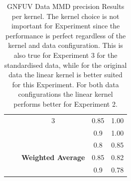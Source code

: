 \documentclass{mpaper}
\begin{document}
\begin{table}[]
\begin{tabular}{|l|c|ccc|}
                                            &                 & \multicolumn{1}{c|}{3}                         & \multicolumn{1}{c|}{0.85}               & 1.00               \\
                                            &                 & \multicolumn{1}{c|}{}                          & \multicolumn{1}{c|}{0.9}                & 1.00               \\ \cline{3-5} 
                                            &                 & \multicolumn{1}{l|}{}                          & \multicolumn{1}{c|}{0.8}                & 0.85               \\
                                            &                 & \multicolumn{1}{c|}{\textbf{Weighted Average}} & \multicolumn{1}{c|}{0.85}               & 0.82               \\
                                            &                 & \multicolumn{1}{l|}{}                          & \multicolumn{1}{c|}{0.9}                & 0.78               \\ \hline
\end{tabular}
\caption{\label{tab:gnfuv_mmd_precision_per_kernel} GNFUV Data MMD precision Results per kernel. The kernel choice is not important for Experiment since the performance is perfect regardless of the kernel and data configuration. This is also true for Experiment 3 for the standardised data, while for the original data the linear kernel is better suited for this Experiment. For both data configurations the linear kernel performs better for Experiment 2. }
\end{table}
\end{document}
